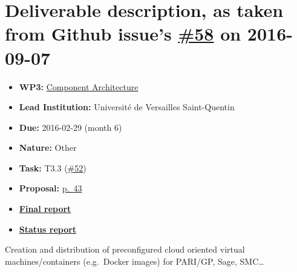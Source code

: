 \section*{\texorpdfstring{Deliverable description, as taken from Github
issue's
\href{https://github.com/OpenDreamKit/OpenDreamKit/issues/58}{\#58} on
2016-09-07}{Deliverable description, as taken from Github issue's \#58 on 2016-09-07}}\label{deliverable-description-as-taken-from-github-issues-58-on-2016-09-07}

\begin{itemize}
\tightlist
\item
  \textbf{WP3:}
  \href{https://github.com/OpenDreamKit/OpenDreamKit/tree/master/WP3}{Component
  Architecture}
\item
  \textbf{Lead Institution:} Université de Versailles Saint-Quentin
\item
  \textbf{Due:} 2016-02-29 (month 6)
\item
  \textbf{Nature:} Other
\item
  \textbf{Task:} T3.3
  (\href{https://github.com/OpenDreamKit/OpenDreamKit/issues/52}{\#52})
\item
  \textbf{Proposal:}
  \href{https://github.com/OpenDreamKit/OpenDreamKit/raw/master/Proposal/proposal-www.pdf}{p.~43}
\item
  \textbf{\href{https://github.com/OpenDreamKit/OpenDreamKit/raw/master/WP3/D3.1/report-final.pdf}{Final
  report}}
\item
  \textbf{\href{https://github.com/OpenDreamKit/OpenDreamKit/wiki/D3.1-Virtual-images-and-containers}{Status
  report}}
\end{itemize}

Creation and distribution of preconfigured cloud oriented virtual
machines/containers (e.g.~Docker images) for PARI/GP, Sage, SMC\ldots{}
